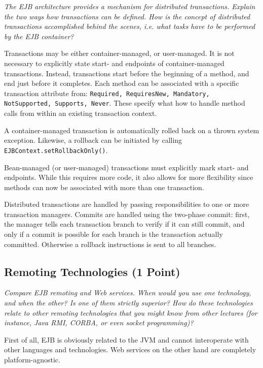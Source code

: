 \documentclass[a4paper,10pt]{article}
\begin{document}
\emph{
The EJB architecture provides a mechanism for distributed transactions. Explain the two ways how
transactions can be defined. How is the concept of distributed transactions accomplished behind the
scenes, i.e. what tasks have to be performed by the EJB container?}

\vspace{3mm}

Transactions may be either container-managed, or user-managed. It is not necessary to explicitly 
state start- and endpoints of container-managed transactions. Instead, transactions start
before the beginning of a method, and end just before it completes. Each method can
be associated with a specific transaction attribute from: \lstinline|Required, RequiresNew, Mandatory, NotSupported, Supports, Never|.
These specify what how to handle method calls from within an existing transaction context.

A container-managed transaction is automatically rolled back on a thrown system exception.
Likewise, a rollback can be initiated by calling \lstinline|EJBContext.setRollbackOnly()|.

Bean-managed (or user-managed) transactions must explicitly mark start- and endpoints.
While this requires more code, it also allows for more flexibility since methods can now
be associated with more than one transaction.

Distributed transactions are handled by passing responsibilities to one or more transaction
managers. Commits are handled using the two-phase commit: first, the manager tells each
transaction branch to verify if it can still commit, and only if a commit is possible
for each branch is the transaction actually committed. Otherwise a rollback instructions
is sent to all branches.

\subsection{Remoting Technologies (1 Point)}

\emph{Compare EJB remoting and Web services. When would you use one technology, and when the other? Is
one of them strictly superior? How do these technologies relate to other remoting technologies that you
might know from other lectures (for instance, Java RMI, CORBA, or even socket programming)?}

\vspace{3mm}

First of all, EJB is obviously related to the JVM and cannot interoperate with other languages
and technologies. Web services on the other hand are completely platform-agnostic.
\end{document}
